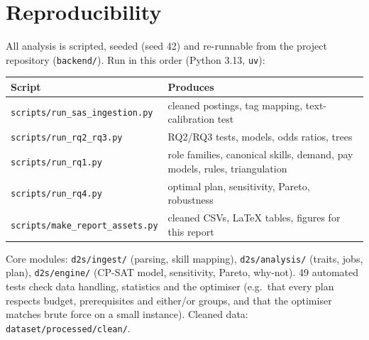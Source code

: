 \section{Reproducibility}\label{app:repro}

All analysis is scripted, seeded (seed 42) and re-runnable from the project repository
(\texttt{backend/}). Run in this order (Python 3.13, \texttt{uv}):

\begin{table}[H]\centering\small
\begin{tabularx}{\linewidth}{@{}L{5.6cm}Y@{}}
\toprule
Script & Produces\\
\midrule
\texttt{scripts/run\_sas\_ingestion.py} & cleaned postings, tag mapping, text-calibration test\\
\texttt{scripts/run\_rq2\_rq3.py} & RQ2/RQ3 tests, models, odds ratios, trees\\
\texttt{scripts/run\_rq1.py} & role families, canonical skills, demand, pay models, rules, triangulation\\
\texttt{scripts/run\_rq4.py} & optimal plan, sensitivity, Pareto, robustness\\
\texttt{scripts/make\_report\_assets.py} & cleaned CSVs, LaTeX tables, figures for this report\\
\bottomrule
\end{tabularx}
\end{table}

Core modules: \texttt{d2s/ingest/} (parsing, skill mapping), \texttt{d2s/analysis/} (traits, jobs,
plan), \texttt{d2s/engine/} (CP-SAT model, sensitivity, Pareto, why-not). 49 automated tests check
data handling, statistics and the optimiser (e.g.\ that every plan respects budget, prerequisites
and either/or groups, and that the optimiser matches brute force on a small instance). Cleaned data:
\texttt{dataset/processed/clean/}.

